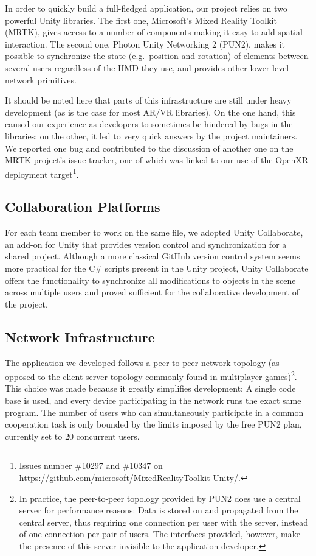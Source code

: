 \documentclass[10pt,twocolumn,letterpaper,english]{article}
\begin{document}
In order to quickly build a full-fledged application, our project relies on two powerful Unity libraries. The first one, Microsoft's Mixed Reality Toolkit (MRTK), gives access to a number of components making it easy to add spatial interaction. The second one, Photon Unity Networking 2 (PUN2), makes it possible to synchronize the state (e.g.\ position and rotation) of elements between several users regardless of the HMD they use, and provides other lower-level network primitives. 

It should be noted here that parts of this infrastructure are still under heavy development (as is the case for most AR/VR libraries). On the one hand, this caused our experience as developers to sometimes be hindered by bugs in the libraries; on the other, it led to very quick answers by the project maintainers. We reported one bug and contributed to the discussion of another one on the MRTK project's issue tracker, one of which was linked to our use of the OpenXR deployment target\footnote{Issues number \href{https://github.com/microsoft/MixedRealityToolkit-Unity/issues/10297}{\#10297} and \href{https://github.com/microsoft/MixedRealityToolkit-Unity/issues/10347}{\#10347} on \url{https://github.com/microsoft/MixedRealityToolkit-Unity/}.}.


\subsection{Collaboration Platforms}

For each team member to work on the same file, we adopted Unity Collaborate, an add-on for Unity that provides version control and synchronization for a shared project. Although a more classical GitHub version control system seems more practical for the C\# scripts present in the Unity project, Unity Collaborate offers the functionality to synchronize all modifications to objects in the scene across multiple users and proved sufficient for the collaborative development of the project.

\subsection{Network Infrastructure} 

The application we developed follows a peer-to-peer network topology (as opposed to the client-server topology commonly found in multiplayer games)\footnote{In practice, the peer-to-peer topology provided by PUN2 does use a central server for performance reasons: Data is stored on and propagated from the central server, thus requiring one connection per user with the server, instead of one connection per pair of users. The interfaces provided, however, make the presence of this server invisible to the application developer.}. This choice was made because it greatly simplifies development: A single code base is used, and every device participating in the network runs the exact same program. The number of users who can simultaneously participate in a common cooperation task is only bounded by the limits imposed by the free PUN2 plan, currently set to 20 concurrent users.
\end{document}
